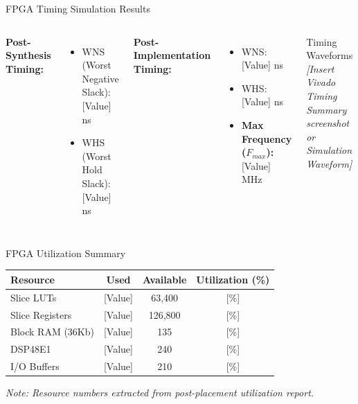 \documentclass[10pt]{beamer}
\begin{document}
\begin{frame}{FPGA Timing Simulation Results}
    \begin{columns}
        \textbf{Post-Synthesis Timing:}
        \begin{itemize}
            \item WNS (Worst Negative Slack): [Value] ns
            \item WHS (Worst Hold Slack): [Value] ns
        \end{itemize}
        
        \vspace{1em}
        \textbf{Post-Implementation Timing:}
        \begin{itemize}
            \item WNS: [Value] ns
            \item WHS: [Value] ns
            \item \textbf{Max Frequency ($F_{max}$):} [Value] MHz
        \end{itemize}
        
        \begin{block}{Timing Waveforms}
            \textit{[Insert Vivado Timing Summary screenshot or Simulation Waveform]}
        \end{block}
    \end{columns}
\end{frame}

\begin{frame}{FPGA Utilization Summary}
    \centering
    \begin{tabular}{lccc}
        \toprule
        Resource & Used & Available & Utilization (\%) \\
        \midrule
        Slice LUTs & [Value] & 63,400 & [\%] \\
        Slice Registers & [Value] & 126,800 & [\%] \\
        Block RAM (36Kb) & [Value] & 135 & [\%] \\
        DSP48E1 & [Value] & 240 & [\%] \\
        I/O Buffers & [Value] & 210 & [\%] \\
        \bottomrule
    \end{tabular}
    
    \vspace{2em}
    \textit{Note: Resource numbers extracted from post-placement utilization report.}
\end{frame}
\end{document}
